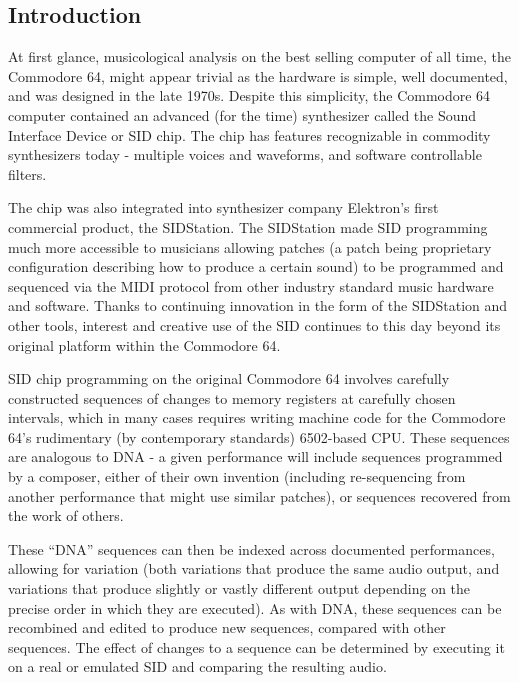 \documentclass[10pt]{article}
\begin{document}
\begin{multicols*}{2}

  \section{Introduction}

  At first glance, musicological analysis on the best selling computer of all time, the Commodore 64\cite{ieeec64}, might appear trivial as the hardware is simple, well documented, and was designed in the late 1970s. Despite this simplicity, the Commodore 64 computer contained an advanced (for the time) synthesizer called the Sound Interface Device\cite{sidpatent} or SID chip. The chip has features recognizable in commodity synthesizers today - multiple voices and waveforms, and software controllable filters.

  The chip was also integrated into synthesizer company Elektron’s first commercial product, the SIDStation\cite{sidstation}.  The SIDStation made SID programming much more accessible to musicians allowing patches (a patch being proprietary configuration describing how to produce a certain sound) to be programmed and sequenced via the MIDI protocol from other industry standard music hardware and software. Thanks to continuing innovation in the form of the SIDStation and other tools, interest and creative use of the SID continues to this day beyond its original platform within the Commodore 64.

SID chip programming on the original Commodore 64 involves carefully constructed sequences of changes to memory registers at carefully chosen intervals, which in many cases requires writing machine code for the Commodore 64's rudimentary (by contemporary standards) 6502-based CPU. These sequences are analogous to DNA - a given performance will include sequences programmed by a composer, either of their own invention (including re-sequencing from another performance that might use similar patches), or sequences recovered from the work of others.

These “DNA” sequences can then be indexed across documented performances, allowing for variation (both variations that produce the same audio output, and variations that produce slightly or vastly different output depending on the precise order in which they are executed). As with DNA, these sequences can be recombined and edited to produce new sequences, compared with other sequences. The effect of changes to a sequence can be determined by executing it on a real or emulated SID and comparing the resulting audio.


\end{multicols*}
\end{document}
